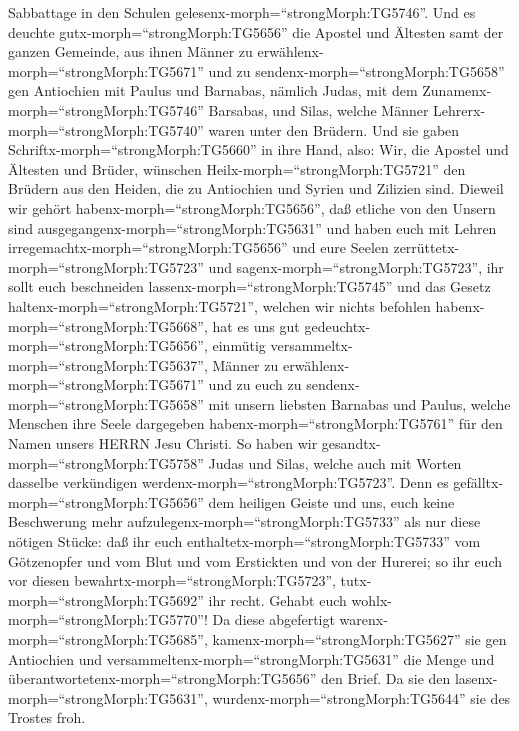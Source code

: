 Sabbattage in den Schulen gelesenx-morph=``strongMorph:TG5746''.
 Und es deuchte gutx-morph=``strongMorph:TG5656'' die
Apostel und Ältesten samt der ganzen Gemeinde, aus ihnen Männer zu
erwählenx-morph=``strongMorph:TG5671'' und zu
sendenx-morph=``strongMorph:TG5658'' gen Antiochien mit Paulus und
Barnabas, nämlich Judas, mit dem Zunamenx-morph=``strongMorph:TG5746''
Barsabas, und Silas, welche Männer Lehrerx-morph=``strongMorph:TG5740''
waren unter den Brüdern.  Und sie gaben
Schriftx-morph=``strongMorph:TG5660'' in ihre Hand, also: Wir, die
Apostel und Ältesten und Brüder, wünschen
Heilx-morph=``strongMorph:TG5721'' den Brüdern aus den Heiden, die zu
Antiochien und Syrien und Zilizien sind.  Dieweil wir
gehört habenx-morph=``strongMorph:TG5656'', daß etliche von den Unsern
sind ausgegangenx-morph=``strongMorph:TG5631'' und haben euch mit Lehren
irregemachtx-morph=``strongMorph:TG5656'' und eure Seelen
zerrüttetx-morph=``strongMorph:TG5723'' und
sagenx-morph=``strongMorph:TG5723'', ihr sollt euch beschneiden
lassenx-morph=``strongMorph:TG5745'' und das Gesetz
haltenx-morph=``strongMorph:TG5721'', welchen wir nichts befohlen
habenx-morph=``strongMorph:TG5668'',  hat es uns gut
gedeuchtx-morph=``strongMorph:TG5656'', einmütig
versammeltx-morph=``strongMorph:TG5637'', Männer zu
erwählenx-morph=``strongMorph:TG5671'' und zu euch zu
sendenx-morph=``strongMorph:TG5658'' mit unsern liebsten Barnabas und
Paulus,  welche Menschen ihre Seele dargegeben
habenx-morph=``strongMorph:TG5761'' für den Namen unsers HERRN Jesu
Christi.  So haben wir
gesandtx-morph=``strongMorph:TG5758'' Judas und Silas, welche auch mit
Worten dasselbe verkündigen werdenx-morph=``strongMorph:TG5723''.
 Denn es gefälltx-morph=``strongMorph:TG5656'' dem heiligen
Geiste und uns, euch keine Beschwerung mehr
aufzulegenx-morph=``strongMorph:TG5733'' als nur diese nötigen Stücke:
 daß ihr euch enthaltetx-morph=``strongMorph:TG5733'' vom
Götzenopfer und vom Blut und vom Erstickten und von der Hurerei; so ihr
euch vor diesen bewahrtx-morph=``strongMorph:TG5723'',
tutx-morph=``strongMorph:TG5692'' ihr recht. Gehabt euch
wohlx-morph=``strongMorph:TG5770''!  Da diese abgefertigt
warenx-morph=``strongMorph:TG5685'', kamenx-morph=``strongMorph:TG5627''
sie gen Antiochien und versammeltenx-morph=``strongMorph:TG5631'' die
Menge und überantwortetenx-morph=``strongMorph:TG5656'' den Brief.
 Da sie den lasenx-morph=``strongMorph:TG5631'',
wurdenx-morph=``strongMorph:TG5644'' sie des Trostes froh. 
